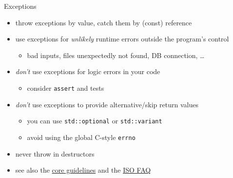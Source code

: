 \begin{frame}[fragile]
  \begin{goodpractice}{Exceptions}
    \begin{itemize}
      \item throw exceptions by value, catch them by (const) reference
      \item use exceptions for \textit{unlikely} runtime errors outside the program's control
      \begin{itemize}
        \item bad inputs, files unexpectedly not found, DB connection, \ldots
      \end{itemize}
      \item \textit{don't} use exceptions for logic errors in your code
      \begin{itemize}
        \item consider \texttt{assert} and tests
      \end{itemize}
      \item \textit{don't} use exceptions to provide alternative/skip return values
      \begin{itemize}
        \item you can use \texttt{std::optional} or \texttt{std::variant}
        \item avoid using the global C-style \texttt{errno}
      \end{itemize}
      \item never throw in destructors
      \item see also the \href{https://isocpp.github.io/CppCoreGuidelines/CppCoreGuidelines#S-errors}{\cpp core guidelines} and the \href{https://isocpp.org/wiki/faq/exceptions}{ISO \cpp FAQ}
    \end{itemize}
  \end{goodpractice}
\end{frame}

